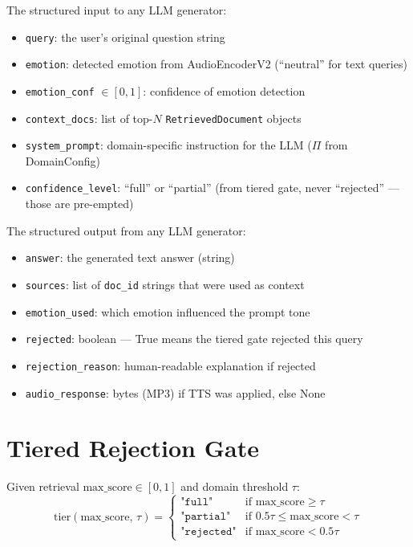 \documentclass[12pt,a4paper]{article}
\theoremstyle{definition}
\theoremstyle{plain}
\theoremstyle{remark}
\begin{document}
\begin{tcolorbox}[defstyle, title={Definition 2.1 — GeneratorInput}]
The structured input to any LLM generator:
\begin{itemize}[noitemsep]
  \item \texttt{query}: the user's original question string
  \item \texttt{emotion}: detected emotion from AudioEncoderV2 (``neutral'' for text queries)
  \item \texttt{emotion\_conf} $\in [0,1]$: confidence of emotion detection
  \item \texttt{context\_docs}: list of top-$N$ \texttt{RetrievedDocument} objects
  \item \texttt{system\_prompt}: domain-specific instruction for the LLM ($\Pi$ from DomainConfig)
  \item \texttt{confidence\_level}: ``full'' or ``partial'' (from tiered gate, never ``rejected'' — those are pre-empted)
\end{itemize}
\end{tcolorbox}

\begin{tcolorbox}[defstyle, title={Definition 2.2 — GeneratorOutput}]
The structured output from any LLM generator:
\begin{itemize}[noitemsep]
  \item \texttt{answer}: the generated text answer (string)
  \item \texttt{sources}: list of \texttt{doc\_id} strings that were used as context
  \item \texttt{emotion\_used}: which emotion influenced the prompt tone
  \item \texttt{rejected}: boolean — True means the tiered gate rejected this query
  \item \texttt{rejection\_reason}: human-readable explanation if rejected
  \item \texttt{audio\_response}: bytes (MP3) if TTS was applied, else None
\end{itemize}
\end{tcolorbox}

\section{Tiered Rejection Gate}

\begin{tcolorbox}[defstyle, title={Definition 3.1 — Three-Way Confidence Tier}]
Given retrieval $\text{max\_score} \in [0,1]$ and domain threshold $\tau$:
\[
\text{tier}(\text{max\_score},\, \tau) =
\begin{cases}
\texttt{"full"} & \text{if } \text{max\_score} \geq \tau \\
\texttt{"partial"} & \text{if } 0.5\tau \leq \text{max\_score} < \tau \\
\texttt{"rejected"} & \text{if } \text{max\_score} < 0.5\tau
\end{cases}
\]
\end{tcolorbox}
\end{document}
